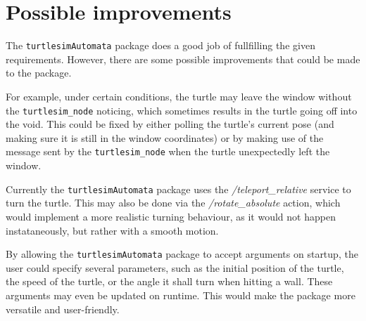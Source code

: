 \chapter{Possible improvements}
\label{chapter:conclusion}

The \texttt{turtlesimAutomata} package does a good job of fullfilling the given requirements. However, there are some possible improvements that could be made to the package. 

For example, under certain conditions, the turtle may leave the window without the \texttt{turtlesim\_node} noticing, which sometimes results in the turtle going off into the void. This could be fixed by either polling the turtle's current pose (and making sure it is still in the window coordinates) or by making use of the message sent by the \texttt{turtlesim\_node} when the turtle unexpectedly left the window.

Currently the \texttt{turtlesimAutomata} package uses the \emph{/teleport\_relative} service to turn the turtle. This may also be done via the \emph{/rotate\_absolute} action, which would implement a more realistic turning behaviour, as it would not happen instataneously, but rather with a smooth motion.

By allowing the \texttt{turtlesimAutomata} package to accept arguments on startup, the user could specify several parameters, such as the initial position of the turtle, the speed of the turtle, or the angle it shall turn when hitting a wall. These arguments may even be updated on runtime. This would make the package more versatile and user-friendly.

